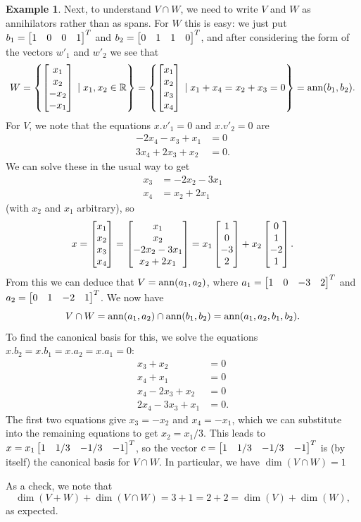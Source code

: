 \documentclass[reqno]{amsart}
\theoremstyle{definition}
\newtheorem{example}[theorem]{Example}
\begin{document}
\begin{example}
 Next, to understand $V\cap W$, we need to write $V$ and $W$ as
 annihilators rather than as spans.  For $W$ this is easy: we just put
 $b_1=\left[\begin{matrix} 1&0&0&1\end{matrix}\right]^T$ and $b_2=\left[\begin{matrix} 0&1&1&0\end{matrix}\right]^T$, and after
 considering the form of the vectors $w'_1$ and $w'_2$ we see that
 \[ W
    = \left\{\left[\begin{matrix} x_1 \\ x_2 \\ -x_2 \\ -x_1\end{matrix}\right] \;|\; x_1,x_2 \in{\mathbb{R}} \right\}
    = \left\{\left[\begin{matrix} x_1 \\ x_2 \\  x_3 \\  x_4\end{matrix}\right] \;|\; x_1+x_4=x_2+x_3=0 \right\}
    = \operatorname{ann}(b_1,b_2).
 \]
 For $V$, we note that the equations $x.v'_1=0$ and $x.v'_2=0$ are
 \begin{align*}
  -2x_4-x_3+x_1 &= 0 \\
  3x_4+2x_3+x_2 &= 0.
 \end{align*}
 We can solve these in the usual way to get
 \begin{align*}
  x_3 &= -2x_2-3x_1 \\
  x_4 &= x_2+2x_1
 \end{align*}
 (with $x_2$ and $x_1$ arbitrary), so
 \[ x
    = \left[\begin{matrix} x_1 \\ x_2 \\ x_3 \\ x_4 \end{matrix}\right]
    = \left[\begin{matrix} x_1 \\ x_2 \\ -2x_2-3x_1 \\ x_2+2x_1 \end{matrix}\right]
    = x_1 \left[\begin{matrix} 1 \\ 0 \\ -3 \\ 2 \end{matrix}\right] +
      x_2 \left[\begin{matrix} 0 \\ 1 \\ -2 \\ 1 \end{matrix}\right].
 \]
 From this we can deduce that $V=\operatorname{ann}(a_1,a_2)$, where
 $a_1=\left[\begin{matrix} 1&0&-3&2\end{matrix}\right]^T$ and $a_2=\left[\begin{matrix} 0&1&-2&1\end{matrix}\right]^T$.  We now have
 \[ V\cap W=\operatorname{ann}(a_1,a_2)\cap\operatorname{ann}(b_1,b_2)=\operatorname{ann}(a_1,a_2,b_1,b_2). \]
 To find the canonical basis for this, we solve the equations
 $x.b_2=x.b_1=x.a_2=x.a_1=0$:
 \begin{align*}
  x_3+x_2 &= 0 \\
  x_4+x_1 &= 0 \\
  x_4-2x_3+x_2 &= 0 \\
  2x_4-3x_3+x_1 &= 0.
 \end{align*}
 The first two equations give $x_3=-x_2$ and $x_4=-x_1$, which we can
 substitute into the remaining equations to get $x_2=x_1/3$.  This
 leads to $x=x_1\left[\begin{matrix} 1&1/3&-1/3&-1\end{matrix}\right]^T$, so the vector
 $c=\left[\begin{matrix} 1&1/3&-1/3&-1\end{matrix}\right]^T$ is (by itself) the canonical basis for
 $V\cap W$.  In particular, we have $\dim(V\cap W)=1$

 As a check, we note that
 \[ \dim(V+W)+\dim(V\cap W) = 3+1 = 2+2 = \dim(V)+\dim(W), \]
 as expected.
\end{example}
\end{document}
